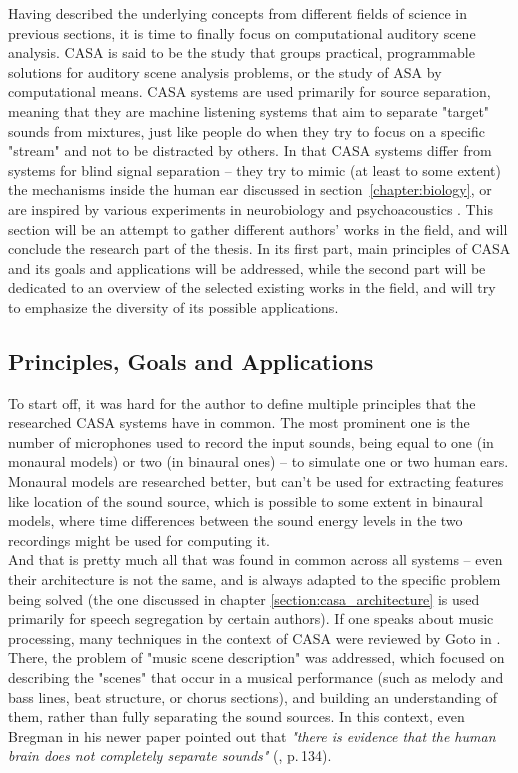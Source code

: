 Having described the underlying concepts from different fields of science in previous sections, it is time to finally focus on computational auditory scene analysis. CASA is said to be the study that groups practical, programmable solutions for auditory scene analysis problems, or the study of ASA by computational means. CASA systems are used primarily for source se\-pa\-ra\-tion, meaning that they are machine listening systems that aim to separate "target" sounds from mixtures, just like people do when they try to focus on a specific "stream" and not to be distracted by others. In that CASA systems differ from systems for blind signal separation – they try to mimic (at least to some extent) the mechanisms inside the human ear discussed in section~\ref{chapter:biology}, or are inspired by various experiments in neurobiology and psychoacoustics \cite{VanDerKouwe2001}. This section will be an attempt to gather different authors' works in the field, and will conclude the research part of the thesis. In its first part, main principles of CASA and its goals and applications will be addressed, while the second part will be dedicated to an overview of the selected existing works in the field, and will try to emphasize the diversity of its possible applications.

\subsection{Principles, Goals and Applications}

To start off, it was hard for the author to define multiple principles that the researched CASA systems have in common. The most prominent one is the number of microphones used to record the input sounds, being equal to one (in monaural models) or two (in binaural ones) -- to simulate one or two human ears. Monaural models are researched better, but can't be used for extracting features like location of the sound source, which is possible to some extent in binaural models, where time differences between the sound energy levels in the two recordings might be used for computing it.\\

And that is pretty much all that was found in common across all systems -- even their architecture is not the same, and is always adapted to the specific problem being solved (the one discussed in chapter \ref{section:casa_architecture} is used primarily for speech segregation by certain authors). If one speaks about music processing, many techniques in the context of CASA were reviewed by Goto in \cite{Wang2006}. There, the problem of "music scene description" was addressed, which focused on describing the "scenes" that occur in a musical performance (such as melody and bass lines, beat structure, or chorus sections), and building an understanding of them, rather than fully separating the sound sources. In this context, even Bregman in his newer paper pointed out that \textit{"there is evidence that the human brain does not completely separate sounds"} (\cite{Bregman1995}, p.\,134).\\

